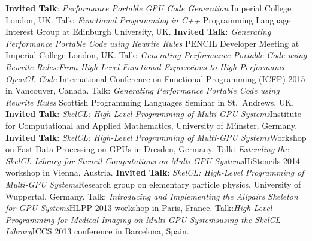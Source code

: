 \documentclass[11pt,a4paper]{moderncv}
\begin{document}
         {\textbf{Invited Talk}: \emph{Performance Portable GPU Code Generation}\newline
         \small Imperial College London, UK.}
         {Talk: \emph{Functional Programming in C++}\newline
         \small Programming Language Interest Group at Edinburgh University, UK.}
         {\textbf{Invited Talk}: \emph{Generating Performance Portable Code using Rewrite Rules}\newline
         \small PENCIL Developer Meeting at Imperial College London, UK.}
         {Talk: \emph{Generating Performance Portable Code using Rewrite Rules:\newline From High-Level Functional Expressions to High-Performance OpenCL Code}\newline
         \small International Conference on Functional Programming (ICFP) 2015 in Vancouver, Canada.}
         {Talk: \emph{Generating Performance Portable Code using Rewrite Rules}\newline
         \small Scottish Programming Languages Seminar in St.\ Andrews, UK.}
         {\textbf{Invited Talk}: \emph{SkelCL\@: High-Level Programming of Multi-GPU
          Systems}\newline \small Institute for Computational and Applied
          Mathematics, University of Münster, Germany.}
         {\textbf{Invited Talk}: \emph{SkelCL\@: High-Level Programming of Multi-GPU
          Systems}\newline \small Workshop on Fast Data Processing on GPUs in
          Dresden, Germany.}
         {Talk: \emph{Extending the SkelCL Library for Stencil
          Computations on Multi-GPU Systems}\newline \small HiStencils 2014
          workshop in Vienna, Austria.}
         {\textbf{Invited Talk}: \emph{SkelCL\@: High-Level Programming of Multi-GPU
          Systems}\newline \small Research group on elementary particle physics,
          University of Wuppertal, Germany.}
         {Talk: \emph{Introducing and Implementing the Allpairs Skeleton for GPU
          Systems}\newline \small HLPP 2013 workshop in Paris, France.}
         {Talk:\emph{High-Level Programming for Medical Imaging on Multi-GPU
          Systems\newline using the SkelCL Library}\newline \small ICCS 2013 conference in
          Barcelona, Spain.}
\end{document}
